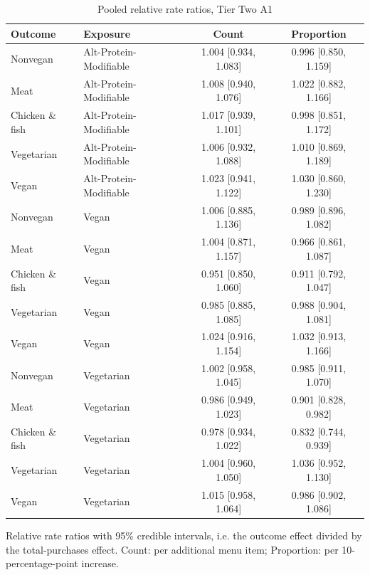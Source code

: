 
\begin{table}[H]
\centering
\caption{Pooled relative rate ratios, Tier Two A1}
\label{tab:rr_t2_a1}
\begin{tabular}{llcc}
\toprule
Outcome & Exposure & Count & Proportion \\
\midrule
Nonvegan & Alt-Protein-Modifiable & 1.004 [0.934, 1.083] & 0.996 [0.850, 1.159] \\
Meat & Alt-Protein-Modifiable & 1.008 [0.940, 1.076] & 1.022 [0.882, 1.166] \\
Chicken \& fish & Alt-Protein-Modifiable & 1.017 [0.939, 1.101] & 0.998 [0.851, 1.172] \\
Vegetarian & Alt-Protein-Modifiable & 1.006 [0.932, 1.088] & 1.010 [0.869, 1.189] \\
Vegan & Alt-Protein-Modifiable & 1.023 [0.941, 1.122] & 1.030 [0.860, 1.230] \\
Nonvegan & Vegan & 1.006 [0.885, 1.136] & 0.989 [0.896, 1.082] \\
Meat & Vegan & 1.004 [0.871, 1.157] & 0.966 [0.861, 1.087] \\
Chicken \& fish & Vegan & 0.951 [0.850, 1.060] & 0.911 [0.792, 1.047] \\
Vegetarian & Vegan & 0.985 [0.885, 1.085] & 0.988 [0.904, 1.081] \\
Vegan & Vegan & 1.024 [0.916, 1.154] & 1.032 [0.913, 1.166] \\
Nonvegan & Vegetarian & 1.002 [0.958, 1.045] & 0.985 [0.911, 1.070] \\
Meat & Vegetarian & 0.986 [0.949, 1.023] & 0.901 [0.828, 0.982] \\
Chicken \& fish & Vegetarian & 0.978 [0.934, 1.022] & 0.832 [0.744, 0.939] \\
Vegetarian & Vegetarian & 1.004 [0.960, 1.050] & 1.036 [0.952, 1.130] \\
Vegan & Vegetarian & 1.015 [0.958, 1.064] & 0.986 [0.902, 1.086] \\
\bottomrule
\end{tabular}
\par\smallskip\footnotesize Relative rate ratios with 95\% credible intervals, i.e. the outcome effect divided by the total-purchases effect. Count: per additional menu item; Proportion: per 10-percentage-point increase.
\end{table}

